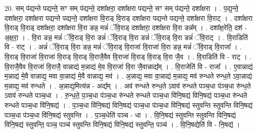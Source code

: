 \documentclass[17pt]{extarticle}
\begin{document}
20. सम् प॑द्यन्ते पद्यन्ते॒ सꣳ सम् प॑द्यन्ते॒ दशा᳚क्षरा॒ दशा᳚क्षरा पद्यन्ते॒ सꣳ सम् प॑द्यन्ते॒ दशा᳚क्षरा । . प॒द्य॒न्ते॒ दशा᳚क्षरा॒ दशा᳚क्षरा पद्यन्ते पद्यन्ते॒ दशा᳚क्षरा वि॒राड् वि॒राड् दशा᳚क्षरा पद्यन्ते पद्यन्ते॒ दशा᳚क्षरा वि॒राट् । . दशा᳚क्षरा वि॒राड् वि॒राड् दशा᳚क्षरा॒ दशा᳚क्षरा वि॒रा डन्न॒ मन्नं॑ ॅवि॒राड् दशा᳚क्षरा॒ दशा᳚क्षरा वि॒रा डन्न᳚म् । . दशा᳚क्ष॒रेति॒ दश॑ - अ॒क्ष॒रा॒ । . वि॒रा डन्न॒ मन्नं॑ ॅवि॒राड् वि॒रा डन्नं॑ ॅवि॒राड् वि॒रा डन्नं॑ ॅवि॒राड् वि॒रा डन्नं॑ ॅवि॒राट् । . वि॒राडिति॑ वि - राट् । . अन्नं॑ ॅवि॒राड् वि॒रा डन्न॒ मन्नं॑ ॅवि॒राड् वि॒राजा॑ वि॒राजा॑ वि॒रा डन्न॒ मन्नं॑ ॅवि॒राड् वि॒राजा᳚ । . वि॒राड् वि॒राजा॑ वि॒राजा॑ वि॒राड् वि॒राड् वि॒राजै॒वैव वि॒राजा॑ वि॒राड् वि॒राड् वि॒रा जै॒व । . वि॒राडिति॑ वि - राट् । . वि॒राजै॒वैव वि॒राजा॑ वि॒राजै॒ वान्नाद्य॑ म॒न्नाद्य॑ मे॒व वि॒राजा॑ वि॒रा जै॒वान्नाद्य᳚म् । . वि॒राजेति॑ वि - राजा᳚ । . ए॒वान्नाद्य॑ म॒न्नाद्य॑ मे॒वै वान्नाद्य॒ मवा वा॒न्नाद्य॑ मे॒वै वान्नाद्य॒ मव॑ । . अ॒न्नाद्य॒ मवा वा॒न्नाद्य॑ म॒न्नाद्य॒ मव॑ रुन्धते रुन्ध॒ते ऽवा॒न्नाद्य॑ म॒न्नाद्य॒ मव॑ रुन्धते । . अ॒न्नाद्य॒मित्य॑न्न - अद्य᳚म् । . अव॑ रुन्धते रुन्ध॒ते ऽवाव॑ रुन्धते पञ्च॒धा प॑ञ्च॒धा रु॑न्ध॒ते ऽवाव॑ रुन्धते पञ्च॒धा । . रु॒न्ध॒ते॒ प॒ञ्च॒धा प॑ञ्च॒धा रु॑न्धते रुन्धते पञ्च॒धा वि॑नि॒षद्य॑ विनि॒षद्य॑ पञ्च॒धा रु॑न्धते रुन्धते पञ्च॒धा वि॑नि॒षद्य॑ । . प॒ञ्च॒धा वि॑नि॒षद्य॑ विनि॒षद्य॑ पञ्च॒धा प॑ञ्च॒धा वि॑नि॒षद्य॑ स्तुवन्ति स्तुवन्ति विनि॒षद्य॑ पञ्च॒धा प॑ञ्च॒धा वि॑नि॒षद्य॑ स्तुवन्ति । . प॒ञ्च॒धेति॑ पञ्च - धा । . वि॒नि॒षद्य॑ स्तुवन्ति स्तुवन्ति विनि॒षद्य॑ विनि॒षद्य॑ स्तुवन्ति॒ पञ्च॒ पञ्च॑ स्तुवन्ति विनि॒षद्य॑ विनि॒षद्य॑ स्तुवन्ति॒ पञ्च॑ । . वि॒नि॒षद्येति॑ वि - नि॒षद्य॑ । \newline
\end{document}
